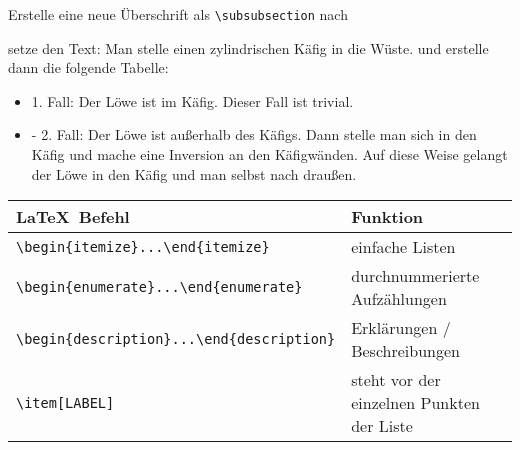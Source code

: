 \documentclass["WS\space 16-17\space -\space LaTeX-Kurs\space -\space Praesentation\space -\space 2.tex"]{subfiles}
\begin{document}
\begin{frame}[fragile]
	\vspace{-0.3cm}
	\begin{Aufgabe}
		Erstelle eine neue Überschrift als \lstinline[basicstyle=\normalfont\normalsize]|\subsubsection| nach 
		
		\textrm{}
		
		setze den Text:	\textrm{Man stelle einen zylindrischen Käfig in die Wüste.}	und erstelle dann die folgende Tabelle:
	\end{Aufgabe}
	\begin{outputbox}
		\vspace{-0.2cm}
		\begin{itemize}
			\item[-]
				1. Fall: Der Löwe ist im Käfig. Dieser Fall ist trivial.
			\item[-]
				2. Fall: Der Löwe ist außerhalb des Käfigs. Dann stelle man sich in den Käfig und mache eine Inversion an den Käfigwänden. Auf diese Weise gelangt der Löwe in den Käfig und man selbst nach draußen.
		\end{itemize}
		\vspace{-0.2cm}
	\end{outputbox}
	\btVFill\Befehle
	\begin{center}
		\begin{tabular}{ll}
			\toprule
			\LaTeX\ Befehl										&	Funktion									\\ \midrule
			\lstinline|\begin{itemize}...\end{itemize}|			&	einfache Listen								\\
			\lstinline|\begin{enumerate}...\end{enumerate}|		&	durchnummerierte Aufzählungen				\\
			\lstinline|\begin{description}...\end{description}|	&	Erklärungen / Beschreibungen				\\
			\lstinline|\item[LABEL]|							&	steht vor der einzelnen Punkten der Liste	\\
			\bottomrule
		\end{tabular}
	\end{center}
	\vspace{0.1cm}
\end{frame}
\end{document}
